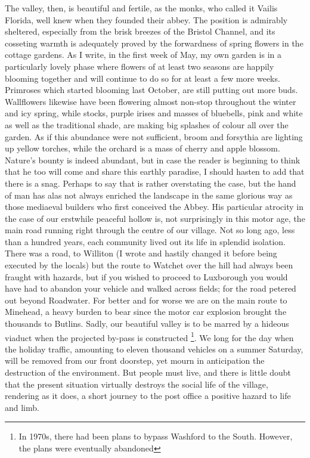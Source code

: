 The valley, then, is beautiful and fertile, as the monks, who called it Vailis Florida, well knew when they founded their abbey. The position is admirably sheltered, especially from the brisk breezes of the Bristol Channel, and its cosseting warmth is adequately proved by the forwardness of spring flowers in the cottage gardens. As I write, in the first week of May, my own garden is in a particularly lovely phase where flowers of at least two seasons are happily blooming together and will continue to do so for at least a few more weeks. Primroses which started blooming last October, are still putting out more buds. Wallflowers likewise have been flowering almost non-stop throughout the winter and icy spring, while stocks, purple irises and masses of bluebells, pink and white as well as the traditional shade, are making big splashes of colour all over the garden. As if this abundance were not sufficient, broom and forsythia are lighting up yellow torches, while the orchard is a mass of cherry and apple blossom. Nature’s bounty is indeed abundant, but in case the reader is beginning to think that he too will come and share this earthly paradise, I should hasten to add that there is a snag. Perhaps to say that  is rather overstating the case, but the hand of man has alas not always enriched the landscape in the same glorious way as those mediaeval builders who first conceived the Abbey. His particular atrocity in the case of our erstwhile peaceful hollow is, not surprisingly in this motor age, the main road running right through the centre of our village. Not so long ago, less than a hundred years, each community lived out its life in splendid isolation. There was a road, to Williton (I wrote  and hastily changed it before being executed by the locals) but the route to Watchet over the hill had always been fraught with hazards, but if you wished to proceed to Luxborough you would have had to abandon your vehicle and walked across fields; for the road petered out beyond Roadwater. For better and for worse we are on the main route to Minehead, a heavy burden to bear since the motor car explosion brought the thousands to Butlins. Sadly, our beautiful valley is to be marred by a hideous viaduct when the projected by-pass is constructed \footnote{In 1970s, there had been plans to bypass Washford to the South. However, the plans were eventually abandoned}. We long for the day when the holiday traffic, amounting to eleven thousand vehicles on a summer Saturday, will be removed from our front doorstep, yet mourn in anticipation the destruction of the environment. But people must live, and there is little doubt that the present situation virtually destroys the social life of the village, rendering as it does, a short journey to the post office a positive hazard to life and limb.

